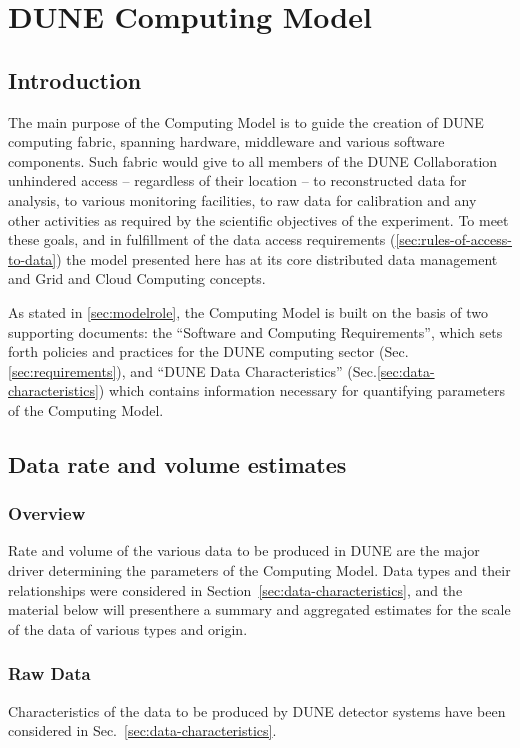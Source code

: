 \section{DUNE Computing Model}
\label{sec:computing_model}

\subsection{Introduction}
The main purpose of the Computing Model is to guide the creation of DUNE computing fabric, spanning
hardware, middleware and various software components. Such fabric would give to all members of the DUNE
Collaboration unhindered access -- regardless of their location -- to reconstructed data for analysis, to various monitoring facilities,
to raw data for calibration and any other activities as required by the scientific objectives of the experiment. To meet these goals,
and in fulfillment of the data access requirements (\ref{sec:rules-of-access-to-data})
the model presented here has at  its core distributed data management and Grid and Cloud Computing concepts.

As stated in \ref{sec:modelrole}, the Computing Model is built on the basis of two supporting documents: the
``Software and Computing Requirements'', which sets forth policies and practices for the DUNE computing sector
(Sec.\ref{sec:requirements}), and ``DUNE Data Characteristics'' (Sec.\ref{sec:data-characteristics}) which contains information
necessary for quantifying parameters of the Computing Model.

\subsection{Data rate and volume estimates}

\subsubsection{Overview}
Rate and volume of the various data to be produced in DUNE are the major driver determining the parameters
of the Computing Model. Data types and their relationships were considered in Section~\ref{sec:data-characteristics},
and the material below will presenthere a summary and aggregated estimates for the scale of the data of various types
and origin.

\subsubsection{Raw Data}
Characteristics of the data to be produced by DUNE detector systems have been considered in
Sec.~\ref{sec:data-characteristics}.

